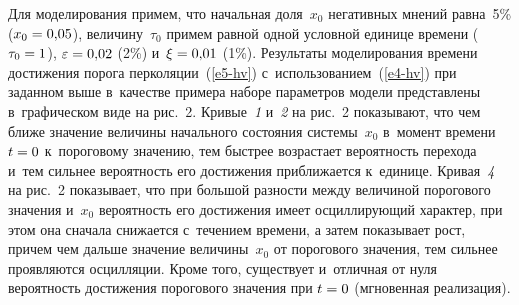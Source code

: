 \begin{multicols}{2}
  Для моделирования примем, что начальная доля~$x_0$ негативных мнений 
равна~5\% ($x_0\hm=0{,}05$), величину~$\tau_0$ примем равной одной 
условной единице времени ($\tau_0\hm =1$), $\varepsilon\hm=0{,}02$ (2\%) 
и~$\xi\hm=0{,}01$ (1\%). Результаты моделирования времени достижения 
порога перколяции~(\ref{e5-hv}) с~использованием~(\ref{e4-hv}) при заданном 
выше в~качестве примера наборе параметров модели представлены 
в~графическом виде на рис.~2.  Кривые~\textit{1} и~\textit{2} на рис.~2 показывают, что чем 
ближе значение величины начального со\-сто\-яния сис\-те\-мы~$x_0$ в~момент 
времени $t\hm=0$ к~пороговому значению, тем быстрее возрастает вероятность 
перехода и~тем сильнее вероятность его достижения приближается к~единице. 
Кривая~\textit{4} на рис.~2 показывает, что при большой разности между 
величиной порогового значения и~$x_0$ вероятность его достижения имеет 
осциллирующий характер, при этом она сначала снижается с~течением времени, 
а затем показывает рост, причем чем дальше значение величины~$x_0$ от 
порогового значения, тем сильнее проявляются осцилляции. Кроме того, 
существует и~отличная от нуля вероятность достижения порогового значения 
при $t\hm=0$ (мгновенная реализация).
  

\setcounter{figure}{1}
\begin{figure*} %
\vspace*{1pt}
\begin{center}
\mbox{%
\epsfxsize=163mm
}
\end{center}
\vspace*{-14pt}
\begin{minipage}[t]{79mm}
\end{minipage}
\hfill
\vspace*{-14pt}
\begin{minipage}[t]{79mm}
\end{minipage}
\vspace*{6pt}
\end{figure*}


\end{multicols}
